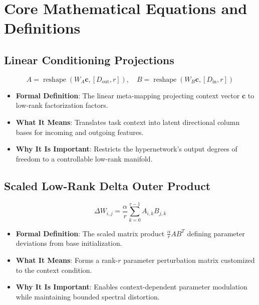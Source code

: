 \documentclass[11pt,a4paper]{article}
\theoremstyle{definition}
\begin{document}
\section{Core Mathematical Equations and Definitions}

\subsection{Linear Conditioning Projections}
{\boldmath
\begin{equation}
A = \operatorname{reshape}\left( W_A \mathbf{c}, [D_{\text{out}}, r] \right), \quad B = \operatorname{reshape}\left( W_B \mathbf{c}, [D_{\text{in}}, r] \right)
\end{equation}
}
\begin{itemize}
    \item \textbf{Formal Definition}: The linear meta-mapping projecting context vector $\mathbf{c}$ to low-rank factorization factors.
    \item \textbf{What It Means}: Translates task context into latent directional column bases for incoming and outgoing features.
    \item \textbf{Why It Is Important}: Restricts the hypernetwork's output degrees of freedom to a controllable low-rank manifold.
\end{itemize}

\subsection{Scaled Low-Rank Delta Outer Product}
{\boldmath
\begin{equation}
\Delta W_{i, j} = \frac{\alpha}{r} \sum_{k=0}^{r-1} A_{i, k} B_{j, k}
\end{equation}
}
\begin{itemize}
    \item \textbf{Formal Definition}: The scaled matrix product $\frac{\alpha}{r} A B^T$ defining parameter deviations from base initialization.
    \item \textbf{What It Means}: Forms a rank-$r$ parameter perturbation matrix customized to the context condition.
    \item \textbf{Why It Is Important}: Enables context-dependent parameter modulation while maintaining bounded spectral distortion.
\end{itemize}
\end{document}
